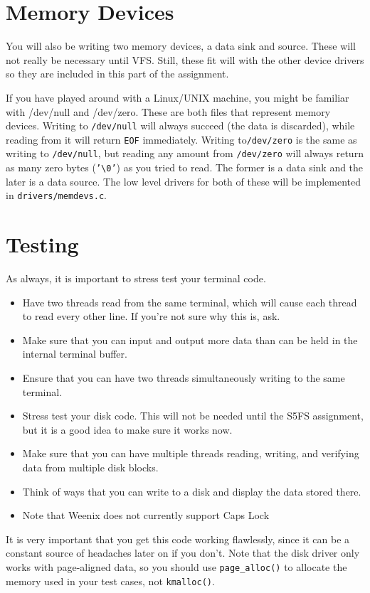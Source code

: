 \section{Memory Devices}
You will also be writing two memory devices, a data sink and source. These will not really be necessary until VFS. Still, these fit will with the other device drivers so they are included in this part of the assignment.

If you have played around with a Linux/UNIX machine, you might be familiar with /dev/null and /dev/zero. These are both files that represent memory devices. Writing to \texttt{/dev/null} will always succeed (the data is discarded), while reading from it will return \texttt{EOF} immediately. Writing to\texttt{/dev/zero} is the same as writing to \texttt{/dev/null}, but reading any amount from \texttt{/dev/zero} will always return as many zero bytes (\texttt{'\textbackslash0'}) as you tried to read. The former is a data sink and the later is a data source. The low level drivers for both of these will be implemented in \texttt{drivers/memdevs.c}. 

\section{Testing}
As always, it is important to stress test your terminal code.
\begin{itemize}
    \item Have two threads read from the same terminal, which will cause each thread to read every other line. If you're not sure why this is, ask.
    \item Make sure that you can input and output more data than can be held in the internal terminal buffer.
    \item Ensure that you can have two threads simultaneously writing to the same terminal.
    \item Stress test your disk code. This will not be needed until the S5FS assignment, but it is a good idea to make sure it works now.
    \item Make sure that you can have multiple threads reading, writing, and verifying data from multiple disk blocks.
    \item Think of ways that you can write to a disk and display the data stored there.
    \item Note that Weenix does not currently support Caps Lock
\end{itemize}
 It is very important that you get this code working flawlessly, since it can be a constant source of headaches later on if you don't. Note that the disk driver only works with page-aligned data, so you should use \texttt{page\_alloc()} to allocate the memory used in your test cases, not \texttt{kmalloc()}.

